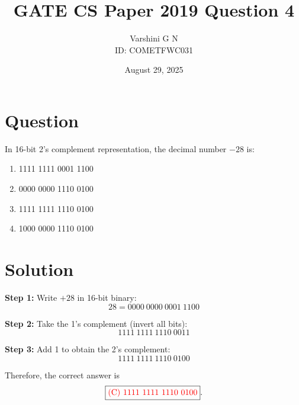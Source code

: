 \documentclass[12pt,a4paper]{article}
\title{\textbf{GATE CS Paper 2019 Question 4}}
\author{Varshini G N \\ ID: COMETFWC031}
\date{August 29, 2025}
\begin{document}
\maketitle

\section*{Question}
In 16-bit 2's complement representation, the decimal number $-28$ is:

\begin{enumerate}[label=(\Alph*)]
  \item 1111 1111 0001 1100
  \item 0000 0000 1110 0100
  \item 1111 1111 1110 0100
  \item 1000 0000 1110 0100
\end{enumerate}

\section*{Solution}
\textbf{Step 1:} Write $+28$ in 16-bit binary:
\[
28 = 0000\ 0000\ 0001\ 1100
\]

\textbf{Step 2:} Take the 1's complement (invert all bits):
\[
1111\ 1111\ 1110\ 0011
\]

\textbf{Step 3:} Add 1 to obtain the 2's complement:
\[
1111\ 1111\ 1110\ 0100
\]

Therefore, the correct answer is
\[
\boxed{\textcolor{red}{\text{(C) }1111\ 1111\ 1110\ 0100}}.
\]
\end{document}
